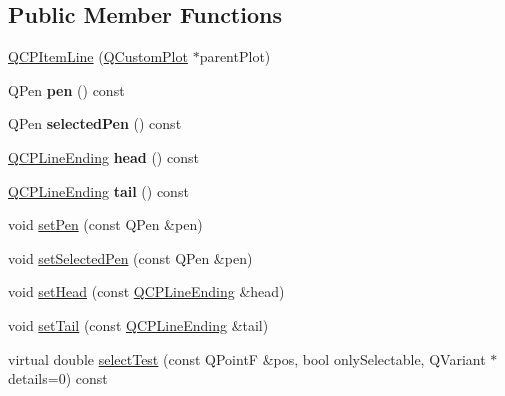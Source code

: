 \subsection*{Public Member Functions}
\begin{DoxyCompactItemize}
\item 
\mbox{\hyperlink{class_q_c_p_item_line_a17804b7f64961c6accf25b61e85142e3}{Q\+C\+P\+Item\+Line}} (\mbox{\hyperlink{class_q_custom_plot}{Q\+Custom\+Plot}} $\ast$parent\+Plot)
\item 
\mbox{\label{class_q_c_p_item_line_a712e5a7f59db3f4c588dfc370a63e225}} 
Q\+Pen {\bfseries pen} () const
\item 
\mbox{\label{class_q_c_p_item_line_ae1782c4fbecd38054ec3d49d8572a5e5}} 
Q\+Pen {\bfseries selected\+Pen} () const
\item 
\mbox{\label{class_q_c_p_item_line_a6cdc9e87e17418d4b0e66eaa0f041407}} 
\mbox{\hyperlink{class_q_c_p_line_ending}{Q\+C\+P\+Line\+Ending}} {\bfseries head} () const
\item 
\mbox{\label{class_q_c_p_item_line_ac085d3939ec11d7a4d592dc2ed578360}} 
\mbox{\hyperlink{class_q_c_p_line_ending}{Q\+C\+P\+Line\+Ending}} {\bfseries tail} () const
\item 
void \mbox{\hyperlink{class_q_c_p_item_line_a572528dab61c1abe205822fbd5db4b27}{set\+Pen}} (const Q\+Pen \&pen)
\item 
void \mbox{\hyperlink{class_q_c_p_item_line_a3e2fec44503277e77717e9c24f87f1ea}{set\+Selected\+Pen}} (const Q\+Pen \&pen)
\item 
void \mbox{\hyperlink{class_q_c_p_item_line_aebf3d687114d584e0459db6759e2c3c3}{set\+Head}} (const \mbox{\hyperlink{class_q_c_p_line_ending}{Q\+C\+P\+Line\+Ending}} \&head)
\item 
void \mbox{\hyperlink{class_q_c_p_item_line_ac264222c3297a7efe33df9345c811a5f}{set\+Tail}} (const \mbox{\hyperlink{class_q_c_p_line_ending}{Q\+C\+P\+Line\+Ending}} \&tail)
\item 
virtual double \mbox{\hyperlink{class_q_c_p_item_line_ae6cc5183f568e5fa9d7827abe4d405b5}{select\+Test}} (const Q\+PointF \&pos, bool only\+Selectable, Q\+Variant $\ast$details=0) const
\end{DoxyCompactItemize}
